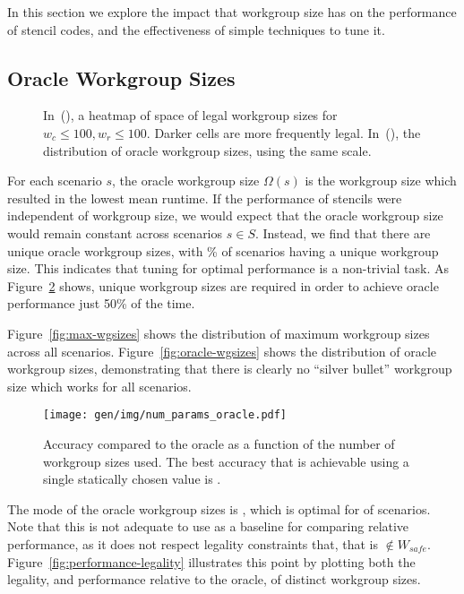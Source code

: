 In this section we explore the impact that workgroup size has on the
performance of stencil codes, and the effectiveness of simple
techniques to tune it.

\subsection{Oracle Workgroup Sizes}


\begin{figure}

\caption{%
  In~(), a heatmap of space of legal workgroup
  sizes for $w_c \le 100, w_r \le 100$. Darker cells are more
  frequently legal. In~(), the distribution
  of oracle workgroup sizes, using the same scale.   %
}
\label{fig:heatmaps}
\end{figure}

For each scenario $s$, the oracle workgroup size $\Omega(s)$ is the
workgroup size which resulted in the lowest mean runtime. If the
performance of stencils were independent of workgroup size, we would
expect that the oracle workgroup size would remain constant across
scenarios $s \in S$. Instead, we find that there are
 unique oracle workgroup sizes, with
\% of scenarios having a
unique workgroup size. This indicates that tuning for optimal
performance is a non-trivial task. As Figure~\ref{fig:oracle-accuracy}
shows,  unique workgroup sizes are
required in order to achieve oracle performance just 50\% of the time.

Figure~\ref{fig:max-wgsizes} shows the distribution of maximum
workgroup sizes across all scenarios. Figure~\ref{fig:oracle-wgsizes}
shows the distribution of oracle workgroup sizes, demonstrating that
there is clearly no ``silver bullet'' workgroup size which works for
all scenarios.

\begin{figure}
\centering
\texttt{[image: gen/img/num\_params\_oracle.pdf]}
\caption{%
  Accuracy compared to the oracle as a function of the number of
  workgroup sizes used. The best accuracy that is achievable using a
  single statically chosen value is
  \protect.%
}
\label{fig:oracle-accuracy}
\end{figure}

The mode of the oracle workgroup sizes is
, which is optimal for
 of scenarios. Note that this is
not adequate to use as a baseline for comparing relative performance,
as it does not respect legality constraints that, that is
$ \not\in W_{safe}$.
Figure~\ref{fig:performance-legality} illustrates this point by
plotting both the legality, and performance relative to the oracle, of
distinct workgroup sizes.



